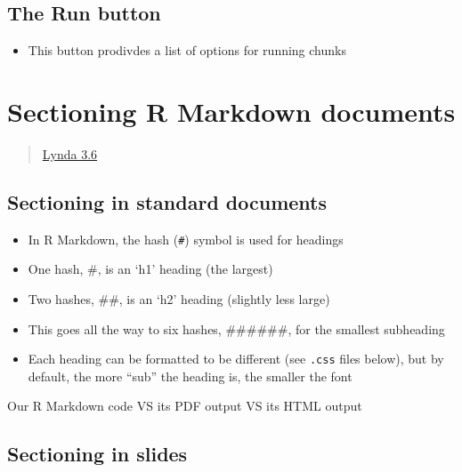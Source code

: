 \documentclass[]{article}
\providecommand{\tightlist}{%
  \setlength{\itemsep}{0pt}\setlength{\parskip}{0pt}}
\begin{document}
\hypertarget{the-run-button}{%
\subsection{The Run button}\label{the-run-button}}

\begin{itemize}
\tightlist
\item
  This button prodivdes a list of options for running chunks
\end{itemize}

\hypertarget{sectioning-r-markdown-documents}{%
\section{Sectioning R Markdown
documents}\label{sectioning-r-markdown-documents}}

\begin{quote}
\href{https://www.lynda.com/RStudio-tutorials/Splitting-documents-sections-slides-R-Markdown/699348/2700135-4.html?srchtrk=index\%3a1\%0alinktypeid\%3a2\%0aq\%3ar+markdown\%0apage\%3a1\%0as\%3arelevance\%0asa\%3atrue\%0aproducttypeid\%3a2}{Lynda
3.6}
\end{quote}

\hypertarget{sectioning-in-standard-documents}{%
\subsection{Sectioning in standard
documents}\label{sectioning-in-standard-documents}}

\begin{itemize}
\tightlist
\item
  In R Markdown, the hash (\texttt{\#}) symbol is used for headings
\item
  One hash, \#, is an `h1' heading (the largest)
\item
  Two hashes, \#\#, is an `h2' heading (slightly less large)
\item
  This goes all the way to six hashes, \#\#\#\#\#\#, for the smallest
  subheading
\item
  Each heading can be formatted to be different (see \texttt{.css} files
  below), but by default, the more ``sub'' the heading is, the smaller
  the font
\end{itemize}

Our R Markdown code VS its PDF output VS its HTML output

\hypertarget{sectioning-in-slides}{%
\subsection{Sectioning in slides}\label{sectioning-in-slides}}
\end{document}
